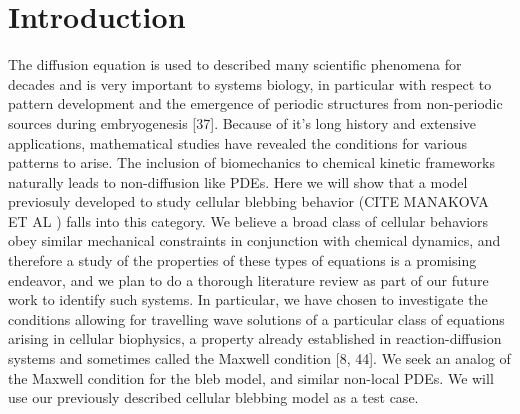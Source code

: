 \section{Introduction}The diffusion equation is used to described many scientific phenomena for decades and is very important to systems biology, in particular with respect to pattern development and the emergence of periodic structures from non-periodic sources during embryogenesis [37]. Because of it's long history and extensive applications, mathematical studies have revealed the conditions for various patterns to arise. The inclusion of biomechanics to chemical kinetic frameworks naturally leads to non-diffusion like PDEs. Here we will show that a model previosuly developed to study cellular blebbing behavior (CITE MANAKOVA ET AL ) falls into this category. We believe a broad class of cellular behaviors obey similar mechanical constraints in conjunction with chemical dynamics, and therefore a study of the properties of these types of equations is a promising endeavor, and we plan to do a thorough literature review as part of our future work to identify such systems. In particular, we have chosen to investigate the conditions allowing for travelling wave solutions of a particular class of equations arising in cellular biophysics, a property already established in reaction-diffusion systems and sometimes called the Maxwell condition [8, 44]. We seek an analog of the Maxwell condition for the bleb model, and similar non-local PDEs. We will use our previously described cellular blebbing model as a test case.
